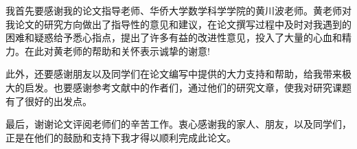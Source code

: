 \acknowledgement
{}

我首先要感谢我的论文指导老师、华侨大学数学科学学院的黄川波老师。黄老师对我论文的研究方向做出了指导性的意见和建议，在论文撰写过程中及时对我遇到的困难和疑惑给予悉心指点，提出了许多有益的改进性意见，投入了大量的心血和精力。在此对黄老师的帮助和关怀表示诚挚的谢意!

此外，还要感谢朋友以及同学们在论文编写中提供的大力支持和帮助，给我带来极大的启发。也要感谢参考文献中的作者们，通过他们的研究文章，使我对研究课题有了很好的出发点。

最后，谢谢论文评阅老师们的辛苦工作。衷心感谢我的家人、朋友，以及同学们，正是在他们的鼓励和支持下我才得以顺利完成此论文。